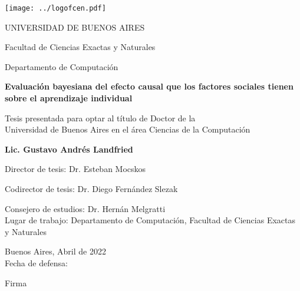 \documentclass[a4paper,10pt]{book}
\author{Gustavo Landfried}
\makeatletter
\renewcommand{\frontmatter}{\cleardoublepage\@mainmatterfalse}
\theoremstyle{definition}
\newcommand{\TITULO}[0]{Evaluación bayesiana del efecto causal que los factores sociales tienen sobre el aprendizaje individual}
\makeatother
\begin{document}
\deactivatequoting %

\frontmatter
{}

\begin{center}

\texttt{[image: ../logofcen.pdf]}

\medskip
UNIVERSIDAD DE BUENOS AIRES

Facultad de Ciencias Exactas y Naturales

Departamento de Computaci\'on


\vspace{3cm}

\textbf{\LARGE \TITULO}

\vspace{1cm}



Tesis presentada para optar al t\'itulo de Doctor de la \\
Universidad de Buenos Aires en el \'area Ciencias de la Computaci\'on

\vspace{3cm}

\textbf{Lic. Gustavo Andr\'es Landfried}

\end{center}

\vspace{2.5cm}

\noindent Director de tesis: Dr. Esteban Mocskos 

\noindent Codirector de tesis: Dr. Diego Fern\'andez Slezak

\noindent Consejero de estudios: Dr. Hern\'an Melgratti \\

\noindent Lugar de trabajo: Departamento de Computaci\'on, Facultad de Ciencias Exactas y Naturales

\vspace{0.5cm}

\noindent Buenos Aires, Abril de 2022\\

\noindent Fecha de defensa: \\%

\vspace{0.5cm}

\hspace*{0pt}\hfill Firma \hspace{2cm}
\end{document}
